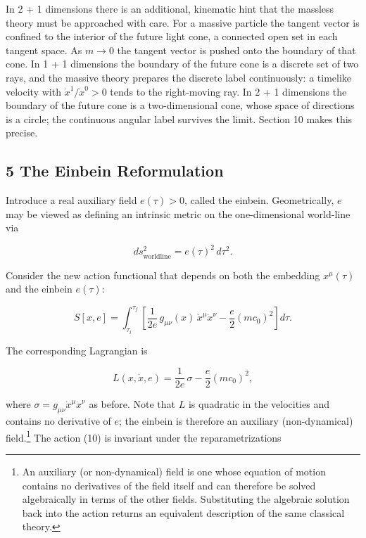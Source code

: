 \documentclass[
]{article}
\begin{document}
In 2 + 1 dimensions there is an additional, kinematic hint that the
massless theory must be approached with care. For a massive particle the
tangent vector is confined to the interior of the future light cone, a
connected open set in each tangent space. As \(m \to 0\) the tangent
vector is pushed onto the boundary of that cone. In 1 + 1 dimensions the
boundary of the future cone is a discrete set of two rays, and the
massive theory prepares the discrete label continuously: a timelike
velocity with \(\dot{x}^{1}/\dot{x}^{0} > 0\) tends to the right-moving
ray. In 2 + 1 dimensions the boundary of the future cone is a
two-dimensional cone, whose space of directions is a circle; the
continuous angular label survives the limit. Section 10 makes this
precise.

\hypertarget{the-einbein-reformulation}{%
\subsection{5 The Einbein
Reformulation}\label{the-einbein-reformulation}}

Introduce a real auxiliary field \(e(\tau) > 0\), called the einbein.
Geometrically, \(e\) may be viewed as defining an intrinsic metric on
the one-dimensional world-line via

\[ds^{2}_{\mathrm{worldline}} = e(\tau)^{2}\, d\tau^{2}. \tag{9}\]

Consider the new action functional that depends on both the embedding
\(x^{\mu}(\tau)\) and the einbein \(e(\tau)\):

\[S[x, e] = \int_{\tau_{i}}^{\tau_{f}} \left[ \frac{1}{2e}\, g_{\mu\nu}(x)\, \dot{x}^{\mu} \dot{x}^{\nu} - \frac{e}{2}(mc_{0})^{2} \right] d\tau. \tag{10}\]

The corresponding Lagrangian is

\[L(x, \dot{x}, e) = \frac{1}{2e}\, \sigma - \frac{e}{2}(mc_{0})^{2}, \tag{11}\]

where \(\sigma = g_{\mu\nu} \dot{x}^{\mu} \dot{x}^{\nu}\) as before.
Note that \(L\) is quadratic in the velocities and contains no
derivative of \(e\); the einbein is therefore an auxiliary
(non-dynamical) field.\footnote{An auxiliary (or non-dynamical) field is
  one whose equation of motion contains no derivatives of the field
  itself and can therefore be solved algebraically in terms of the other
  fields. Substituting the algebraic solution back into the action
  returns an equivalent description of the same classical theory.} The
action (10) is invariant under the reparametrizations
\end{document}
